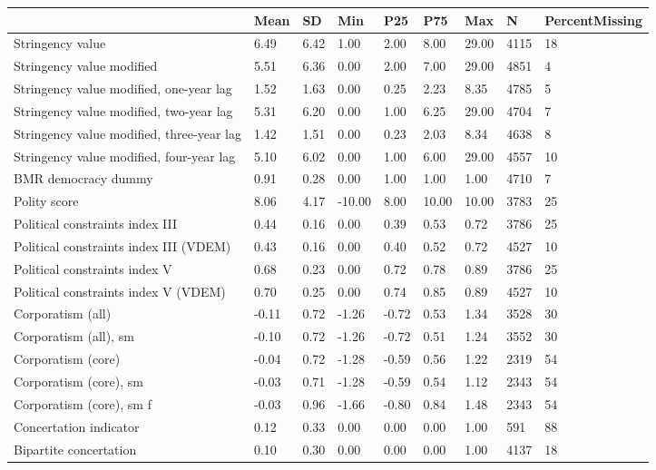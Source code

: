 
\begin{longtable}{lllllllll}
\toprule
  & Mean & SD & Min & P25 & P75 & Max & N & PercentMissing\\
\midrule
Stringency value & 6.49 & 6.42 & 1.00 & 2.00 & 8.00 & 29.00 & 4115 & 18\\
Stringency value modified & 5.51 & 6.36 & 0.00 & 2.00 & 7.00 & 29.00 & 4851 & 4\\
Stringency value modified, one-year lag & 1.52 & 1.63 & 0.00 & 0.25 & 2.23 & 8.35 & 4785 & 5\\
Stringency value modified, two-year lag & 5.31 & 6.20 & 0.00 & 1.00 & 6.25 & 29.00 & 4704 & 7\\
Stringency value modified, three-year lag & 1.42 & 1.51 & 0.00 & 0.23 & 2.03 & 8.34 & 4638 & 8\\
\addlinespace
Stringency value modified, four-year lag & 5.10 & 6.02 & 0.00 & 1.00 & 6.00 & 29.00 & 4557 & 10\\
BMR democracy dummy & 0.91 & 0.28 & 0.00 & 1.00 & 1.00 & 1.00 & 4710 & 7\\
Polity score & 8.06 & 4.17 & -10.00 & 8.00 & 10.00 & 10.00 & 3783 & 25\\
Political constraints index III & 0.44 & 0.16 & 0.00 & 0.39 & 0.53 & 0.72 & 3786 & 25\\
Political constraints index III (VDEM) & 0.43 & 0.16 & 0.00 & 0.40 & 0.52 & 0.72 & 4527 & 10\\
\addlinespace
Political constraints index V & 0.68 & 0.23 & 0.00 & 0.72 & 0.78 & 0.89 & 3786 & 25\\
Political constraints index V (VDEM) & 0.70 & 0.25 & 0.00 & 0.74 & 0.85 & 0.89 & 4527 & 10\\
Corporatism (all) & -0.11 & 0.72 & -1.26 & -0.72 & 0.53 & 1.34 & 3528 & 30\\
Corporatism (all), sm & -0.10 & 0.72 & -1.26 & -0.72 & 0.51 & 1.24 & 3552 & 30\\
Corporatism (core) & -0.04 & 0.72 & -1.28 & -0.59 & 0.56 & 1.22 & 2319 & 54\\
\addlinespace
Corporatism (core), sm & -0.03 & 0.71 & -1.28 & -0.59 & 0.54 & 1.12 & 2343 & 54\\
Corporatism (core), sm f & -0.03 & 0.96 & -1.66 & -0.80 & 0.84 & 1.48 & 2343 & 54\\
Concertation indicator & 0.12 & 0.33 & 0.00 & 0.00 & 0.00 & 1.00 & 591 & 88\\
Bipartite concertation & 0.10 & 0.30 & 0.00 & 0.00 & 0.00 & 1.00 & 4137 & 18\\

\end{longtable}
